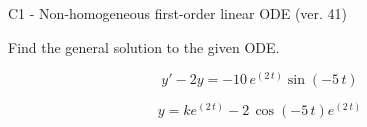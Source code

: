 \begin{exercise}
  \begin{exerciseTitle}C1 - Non-homogeneous first-order linear ODE (ver. 41)\end{exerciseTitle}
  \begin{exerciseStatement}
    
Find the general solution to the given ODE.

    
\[y'-2y= -10 \, e^{\left(2 \, t\right)} \sin\left(-5 \, t\right)\]

  \end{exerciseStatement}
  \begin{exerciseAnswer}
    
\[y= k e^{\left(2 \, t\right)} - 2 \, \cos\left(-5 \, t\right) e^{\left(2 \, t\right)}\]

  \end{exerciseAnswer}
\end{exercise}